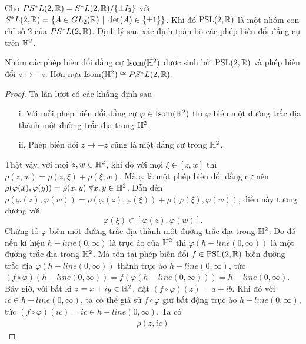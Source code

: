 Cho $PS^*L(2,\mathbb{R}) = S^*L(2,\mathbb{R})/\{\pm I_2\}$ với $S^*L(2,\mathbb{R}) = \{A \in GL_2(\mathbb{R})~|~\det(A) \in \{\pm 1\}\}$. Khi đó $\operatorname{PSL}(2,\mathbb{R})$ là một nhóm con chỉ số 2 của $PS^*L(2,\mathbb{R})$. Định lý sau xác định toàn bộ các phép biến đổi đẳng cự trên $\mathbb{H}^2$.
\begin{thm}\label{thm 2.3.7}
    Nhóm các phép biến đổi đẳng cự $\operatorname{Isom}(\mathbb{H}^2)$ được sinh bởi $\operatorname{PSL}(2,\mathbb{R})$ và phép biến đổi $z\mapsto -\overline{z}$. Hơn nữa $\operatorname{Isom}(\mathbb{H}^2) \cong PS^*L(2,\mathbb{R})$.
\end{thm}
\begin{proof}
    Ta lần lượt có các khẳng định sau
    \begin{itemize}
        \item[i.] Với mỗi phép biến đổi đẳng cự $\varphi \in \operatorname{Isom}(\mathbb{H}^2)$ thì $\varphi$ biến một đường trắc địa thành một đường trắc địa trong $\mathbb{H}^2$.
        \item[ii.] Phép biến đổi $z\mapsto -\overline{z}$ cũng là một đẳng cự trong $\mathbb{H}^2$.
    \end{itemize}
    Thật vậy, với mọi $z, w \in \mathbb{H}^2$, khi đó với mọi $\xi \in [z,w]$ thì $\rho(z,w)= \rho(z,\xi)+\rho(\xi,w)$. Mà $\varphi$ là một phép biến đổi đẳng cự nên $\rho(\varphi(x),\varphi(y))=\rho(x,y)~\forall x,y\in \mathbb{H}^2$. Dẫn đến $\rho(\varphi(z),\varphi(w)) = \rho(\varphi(z),\varphi(\xi)) + \rho(\varphi(\xi),\varphi(w))$, điều này tương đương với \[\varphi(\xi) \in [\varphi(z),\varphi(w)].\] Chứng tỏ $\varphi$ biến một đường trắc địa thành một đường trắc địa trong $\mathbb{H}^2$. Do đó nếu kí hiệu $h-line(0,\infty)$ là trục ảo của $\mathbb{H}^2$ thì $\varphi(h-line(0,\infty))$ là một đường trắc địa trong $\mathbb{H}^2$. Mà tồn tại phép biến đổi $f \in \operatorname{PSL}(2,\mathbb{R})$ biến đường trắc địa $\varphi(h-line(0,\infty))$ thành trục ảo $h-line(0,\infty)$, tức $(f\circ \varphi)(h-line(0,\infty)) = f(\varphi(h-line(0,\infty))) = h-line(0,\infty)$. 
    Bây giờ, với bất kì $z = x+iy \in \mathbb{H}^2$, đặt $(f\circ \varphi)(z) = a+ib$. Khi đó với $ic \in h-line(0,\infty)$, ta có thể giả sử $f\circ \varphi$ giữ bất động trục ảo $h-line(0,\infty)$, tức $(f\circ \varphi)(ic) = ic \in h-line(0,\infty)$. Ta có
    \begin{align*}
        \rho(z,ic)

\end{align*}
\end{proof}
